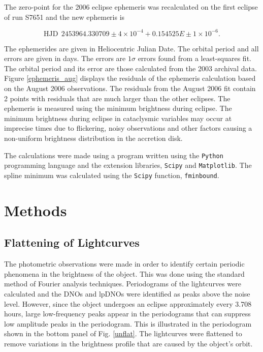 The zero-point for the 2006 eclipse ephemeris was recalculated on the first eclipse of run S7651 and the new ephemeris is

\begin{equation}
	\textrm{HJD}\:\: 2453964.330709 \pm 4 \times 10^{-4} + 0.154525E \pm  1\times 10^{-6}.
\label{aug_ephem}
\end{equation}

The ephemerides are given in Heliocentric Julian Date. The orbital period and all errors are given in days. The errors are $1\sigma$ errors found from a least-squares fit. The orbital period and its error are those calculated from the 2003 archival data. Figure \ref{ephemeris_aug} displays the residuals of the ephemeris calculation based on the August 2006 observations. The residuals from the August 2006 fit contain 2 points with residuals that are much larger than the other eclipses. The ephemeris is measured using the minimum brightness during eclipse. The minimum brightness during eclipse in cataclysmic variables may occur at imprecise times due to flickering, noisy observations and other factors causing a non-uniform brightness distribution in the accretion disk.

The calculations were made using a program written using the \texttt{Python} programming language and the extension libraries, \texttt{Scipy} and \texttt{Matplotlib}. The spline minimum was calculated using the \texttt{Scipy} function, \texttt{fminbound}.

\section{Methods}
\subsection{Flattening of Lightcurves}

\label{flat_section}

The photometric observations were made in order to identify certain periodic phenomena in the brightness of the object. This was done using the standard method of Fourier analysis techniques. Periodograms of the lightcurves were calculated and the DNOs and lpDNOs were identified as peaks above the noise level. However, since the object undergoes an eclipse approximately every 3.708 hours, large low-frequency peaks appear in the periodograms that can suppress low amplitude peaks in the periodogram. This is illustrated in the periodogram shown in the bottom panel of Fig. \ref{unflat}. The lightcurves were flattened to remove variations in the brightness profile that are caused by the object's orbit.


